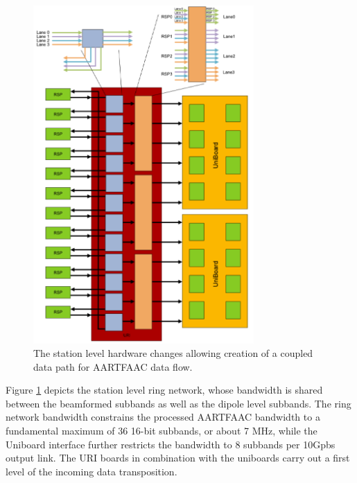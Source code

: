 \documentclass{ws-jai}
\begin{document}
\begin{figure}[htbp]
\centering
\includegraphics[width=0.75\textwidth]{Figs/station_hw_proc_afaac.png}
\caption{The station level hardware changes  allowing creation of a coupled data
  path for AARTFAAC data flow.}
\label{fig:afaac_station_hw}
\end{figure}

Figure \ref{fig:afaac_station_hw} depicts the  station level ring network, whose
bandwidth is shared between the beamformed  subbands as well as the dipole level
subbands. The ring network bandwidth constrains the processed AARTFAAC bandwidth
to  a fundamental  maximum of  36 16-bit  subbands, or  about 7  MHz, while  the
Uniboard  interface further  restricts the  bandwidth to  8 subbands  per 10Gpbs
output link. The URI boards in combination  with the uniboards carry out a first
level of the incoming data transposition.
\end{document}
